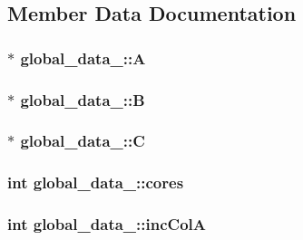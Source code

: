 \subsection{Member Data Documentation}
\subsubsection[{A}]{$\ast$ global\+\_\+data\+\_\+\+::A}\hypertarget{structglobal__data___a26183bd4c0aa27bcae35d80b2ec4ffdb}{}\label{structglobal__data___a26183bd4c0aa27bcae35d80b2ec4ffdb}
\subsubsection[{B}]{$\ast$ global\+\_\+data\+\_\+\+::B}\hypertarget{structglobal__data___a4f4d4bfd8beb5e25adf33057bc56b8c9}{}\label{structglobal__data___a4f4d4bfd8beb5e25adf33057bc56b8c9}
\subsubsection[{C}]{$\ast$ global\+\_\+data\+\_\+\+::C}\hypertarget{structglobal__data___ae4ba970c9e094e8151f4bee44451a7e8}{}\label{structglobal__data___ae4ba970c9e094e8151f4bee44451a7e8}
\subsubsection[{cores}]{\setlength{\rightskip}{0pt plus 5cm}int global\+\_\+data\+\_\+\+::cores}\hypertarget{structglobal__data___ad39cc3a27438a347026cedf1b1e0c028}{}\label{structglobal__data___ad39cc3a27438a347026cedf1b1e0c028}
\subsubsection[{inc\+ColA}]{\setlength{\rightskip}{0pt plus 5cm}int global\+\_\+data\+\_\+\+::inc\+ColA}\hypertarget{structglobal__data___afdbb841d5c8e3ec74f10014dca629686}{}\label{structglobal__data___afdbb841d5c8e3ec74f10014dca629686}
